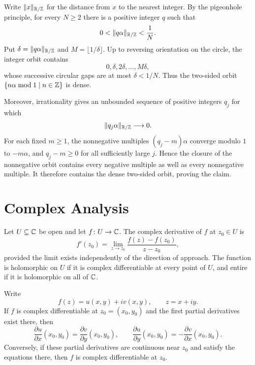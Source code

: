     \begin{idea}
        Write $\lVert x\rVert_{\mathbb{R}/\mathbb{Z}}$ for the distance from $x$ to the nearest
        integer. By the pigeonhole principle, for every $N\geq2$ there is a
        positive integer $q$ such that
        \[
            0<\lVert q\alpha\rVert_{\mathbb{R}/\mathbb{Z}}<\frac1N.
        \]
        Put $\delta=\lVert q\alpha\rVert_{\mathbb{R}/\mathbb{Z}}$ and
        $M=\lfloor1/\delta\rfloor$. Up to reversing orientation on the circle,
        the integer orbit contains
        \[
            0,\delta,2\delta,\dots,M\delta,
        \]
        whose successive circular gaps are at most $\delta<1/N$. Thus the
        two-sided orbit $\{n\alpha\bmod1\mid n\in\mathbb{Z}\}$ is dense.

        Moreover, irrationality gives an unbounded sequence of positive
        integers $q_j$ for which
        \[
            \lVert q_j\alpha\rVert_{\mathbb{R}/\mathbb{Z}}\longrightarrow0.
        \]
        For each fixed $m\geq1$, the nonnegative multiples
        $(q_j-m)\alpha$ converge modulo $1$ to $-m\alpha$, and $q_j-m\geq0$
        for all sufficiently large $j$. Hence the closure of the nonnegative
        orbit contains every negative multiple as well as every nonnegative
        multiple. It therefore contains the dense two-sided orbit, proving the
        claim.
    \end{idea}

    \section*{Complex Analysis}

    \begin{definition}
        Let $U\subseteq\mathbb{C}$ be open and let $f\colon U\to\mathbb{C}$. The complex derivative of
        $f$ at $z_0\in U$ is
        \[
            f'(z_0)
            =
            \lim\limits_{z\to z_0}
            \frac{f(z)-f(z_0)}{z-z_0},
        \]
        provided the limit exists independently of the direction of approach.
        The function is holomorphic on $U$ if it is complex differentiable at
        every point of $U$, and entire if it is holomorphic on all of $\mathbb{C}$.
    \end{definition}

    \begin{theorem}
        Write
        \[
            f(z)=u(x,y)+iv(x,y),
            \qquad
            z=x+iy.
        \]
        If $f$ is complex differentiable at $z_0=(x_0,y_0)$ and the first partial
        derivatives exist there, then
        \[
            \frac{\partial u}{\partial x}(x_0,y_0)
            =
            \frac{\partial v}{\partial y}(x_0,y_0),
            \qquad
            \frac{\partial u}{\partial y}(x_0,y_0)
            =
            -\frac{\partial v}{\partial x}(x_0,y_0).
        \]
        Conversely, if these partial derivatives are continuous near $z_0$ and
        satisfy the equations there, then $f$ is complex differentiable at
        $z_0$.
    \end{theorem}

